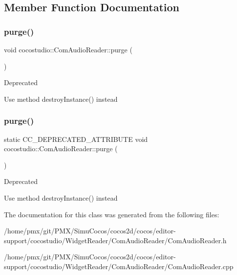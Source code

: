 \subsection{Member Function Documentation}
\mbox{\label{classcocostudio_1_1ComAudioReader_ad26fecc90709cb7ab56fe06c62f738b5}} 
\subsubsection{\texorpdfstring{purge()}{purge()}\hspace{0.1cm}{\footnotesize\ttfamily [1/2]}}
{\footnotesize\ttfamily void cocostudio\+::\+Com\+Audio\+Reader\+::purge (\begin{DoxyParamCaption}{ }\end{DoxyParamCaption})\hspace{0.3cm}{\ttfamily [static]}}

\begin{DoxyRefDesc}{Deprecated}
\item[\hyperlink{deprecated__deprecated000086}{Deprecated}]Use method destroy\+Instance() instead \end{DoxyRefDesc}
\mbox{\label{classcocostudio_1_1ComAudioReader_a73b04cfd102b40fdf4bf5a79700d253f}} 
\subsubsection{\texorpdfstring{purge()}{purge()}\hspace{0.1cm}{\footnotesize\ttfamily [2/2]}}
{\footnotesize\ttfamily static C\+C\+\_\+\+D\+E\+P\+R\+E\+C\+A\+T\+E\+D\+\_\+\+A\+T\+T\+R\+I\+B\+U\+TE void cocostudio\+::\+Com\+Audio\+Reader\+::purge (\begin{DoxyParamCaption}{ }\end{DoxyParamCaption})\hspace{0.3cm}{\ttfamily [static]}}

\begin{DoxyRefDesc}{Deprecated}
\item[\hyperlink{deprecated__deprecated000321}{Deprecated}]Use method destroy\+Instance() instead \end{DoxyRefDesc}


The documentation for this class was generated from the following files\+:\begin{DoxyCompactItemize}
\item 
/home/pmx/git/\+P\+M\+X/\+Simu\+Cocos/cocos2d/cocos/editor-\/support/cocostudio/\+Widget\+Reader/\+Com\+Audio\+Reader/Com\+Audio\+Reader.\+h\item 
/home/pmx/git/\+P\+M\+X/\+Simu\+Cocos/cocos2d/cocos/editor-\/support/cocostudio/\+Widget\+Reader/\+Com\+Audio\+Reader/Com\+Audio\+Reader.\+cpp\end{DoxyCompactItemize}
